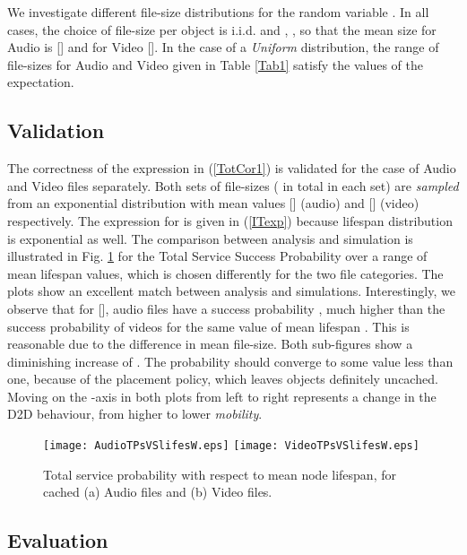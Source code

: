 \documentclass[conference]{IEEEtran}
\begin{document}
{We investigate different file-size distributions for the random variable . In all cases, the choice of file-size per object  is i.i.d. and , , so that the mean size for Audio is  [] and for Video  []. In the case of a \textit{Uniform} distribution, the range of file-sizes for Audio and Video given in Table \ref{Tab1} satisfy the values of the expectation.


\subsection{Validation}

The correctness of the expression in (\ref{TotCor1}) is validated for the case of Audio and Video files separately. Both sets of file-sizes ( in total in each set) are \textit{sampled} from an exponential distribution with mean values  [] (audio) and  [] (video) respectively. The expression for  is given in (\ref{ITexp}) because lifespan distribution is exponential as well. The comparison between analysis and simulation is illustrated in Fig. \ref{fig:valid} for the Total Service Success Probability over a range of mean lifespan values, which is chosen differently for the two file categories. The plots show an excellent match between analysis and simulations. Interestingly, we observe that for  [], audio files have a success probability , much higher than the success probability of videos for the same value of mean lifespan . This is reasonable due to the difference in mean file-size. Both sub-figures show a diminishing increase of . The probability should converge to some value less than one, because of the placement policy, which leaves  objects definitely uncached. Moving on the -axis in both plots from left to right represents a change in the D2D behaviour, from higher to lower \textit{mobility}.
\begin{figure}[ht!]
\centering
\texttt{[image: AudioTPsVSlifesW.eps]}
\texttt{[image: VideoTPsVSlifesW.eps]}
\caption{Total service probability with respect to mean node lifespan, for cached (a) Audio files and (b) Video files.}
\label{fig:valid}
\end{figure}


\subsection{Evaluation}

}
\end{document}
